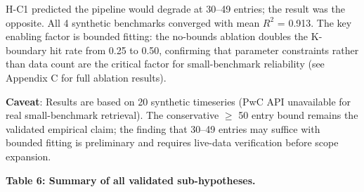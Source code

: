 H-C1 predicted the pipeline would degrade at 30--49 entries; the result was the opposite. All 4 synthetic benchmarks converged with mean $R^2$ = 0.913. The key enabling factor is bounded fitting: the no-bounds ablation doubles the K-boundary hit rate from 0.25 to 0.50, confirming that parameter constraints rather than data count are the critical factor for small-benchmark reliability (see Appendix C for full ablation results).

\textbf{Caveat}: Results are based on 20 synthetic timeseries (PwC API unavailable for real small-benchmark retrieval). The conservative $\geq$ 50 entry bound remains the validated empirical claim; the finding that 30--49 entries may suffice with bounded fitting is preliminary and requires live-data verification before scope expansion.

\textbf{Table 6: Summary of all validated sub-hypotheses.}

\begin{table}[htbp]
\centering
{}
\end{table}

